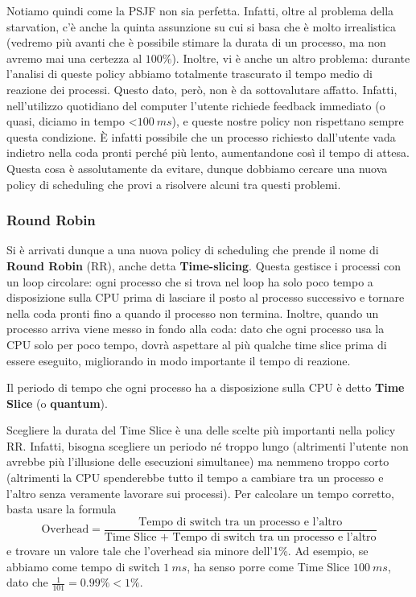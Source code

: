 \documentclass[11pt, a4paper, titlepage, oneside]{scrbook}
\begin{document}
Notiamo quindi come la PSJF non sia perfetta. Infatti, oltre al problema della starvation, c'è anche la quinta assunzione su cui si basa che è molto irrealistica (vedremo più avanti che è possibile stimare la durata di un processo, ma non avremo mai una certezza al $100\%$). Inoltre, vi è anche un altro problema: durante l'analisi di queste policy abbiamo totalmente trascurato il tempo medio di reazione dei processi. Questo dato, però, non è da sottovalutare affatto. Infatti, nell'utilizzo quotidiano del computer l'utente richiede feedback immediato (o quasi, diciamo in tempo <$\SI{100}{ms}$), e queste nostre policy non rispettano sempre questa condizione. È infatti possibile che un processo richiesto dall'utente vada indietro nella coda pronti perché più lento, aumentandone così il tempo di attesa. Questa cosa è assolutamente da evitare, dunque dobbiamo cercare una nuova policy di scheduling che provi a risolvere alcuni tra questi problemi.

\subsubsection*{Round Robin}

Si è arrivati dunque a una nuova policy di scheduling che prende il nome di \textbf{Round Robin} (RR), anche detta \textbf{Time-slicing}. Questa gestisce i processi con un loop circolare: ogni processo che si trova nel loop ha solo poco tempo a disposizione sulla CPU prima di lasciare il posto al processo successivo e tornare nella coda pronti fino a quando il processo non termina. Inoltre, quando un processo arriva viene messo in fondo alla coda: dato che ogni processo usa la CPU solo per poco tempo, dovrà aspettare al più qualche time slice prima di essere eseguito, migliorando in modo importante il tempo di reazione.

\begin{Definizione}
\label{def-time-slice}
Il periodo di tempo che ogni processo ha a disposizione sulla CPU è detto \textbf{Time Slice} (o \textbf{quantum}).
\end{Definizione}

Scegliere la durata del Time Slice è una delle scelte più importanti nella policy RR. Infatti, bisogna scegliere un periodo né troppo lungo (altrimenti l'utente non avrebbe più l'illusione delle esecuzioni simultanee) ma nemmeno troppo corto (altrimenti la CPU spenderebbe tutto il tempo a cambiare tra un processo e l'altro senza veramente lavorare sui processi). Per calcolare un tempo corretto, basta usare la formula
\[
\text{Overhead} = \frac{\text{Tempo di switch tra un processo e l'altro}}{\text{Time Slice + Tempo di switch tra un processo e l'altro}}
\] 
e trovare un valore tale che l'overhead sia minore dell'1\%. Ad esempio, se abbiamo come tempo di switch $\SI{1}{ms}$, ha senso porre come Time Slice \textbf{\boldmath$\SI[reset-math-version=false]{100}{ms}$}, dato che $\frac{1}{101} = 0.99 \% < 1\%$.
\end{document}
